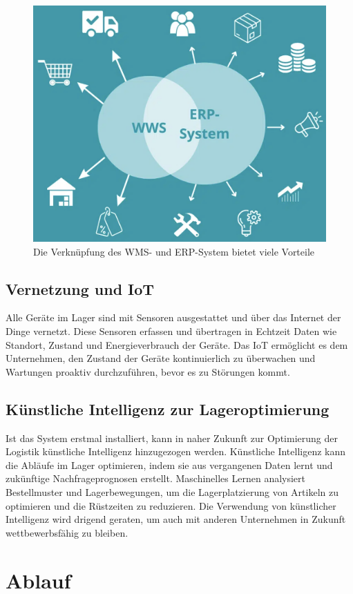 \begin{figure}[H]
	\centering
	\includegraphics[width=0.8\linewidth]{images/ERP}
	\caption{Die Verknüpfung des WMS- und ERP-System bietet viele Vorteile}
	\label{fig:92105db8-75fe-4262-9bd0-b83cf46d7e20}
\end{figure}

\subsection{Vernetzung und IoT}
 Alle Geräte im Lager sind mit Sensoren ausgestattet und über das Internet der Dinge vernetzt. Diese Sensoren erfassen und übertragen in Echtzeit Daten wie Standort, Zustand und Energieverbrauch der Geräte. Das IoT ermöglicht es dem Unternehmen, den Zustand der Geräte kontinuierlich zu überwachen und Wartungen proaktiv durchzuführen, bevor es zu Störungen kommt.

\subsection{Künstliche Intelligenz zur Lageroptimierung}
Ist das System erstmal installiert, kann in naher Zukunft zur Optimierung der Logistik künstliche Intelligenz hinzugezogen werden. Künstliche Intelligenz kann die Abläufe im Lager optimieren, indem sie aus vergangenen Daten lernt und zukünftige Nachfrageprognosen erstellt. Maschinelles Lernen analysiert Bestellmuster und Lagerbewegungen, um die Lagerplatzierung von Artikeln zu optimieren und die Rüstzeiten zu reduzieren. Die Verwendung von künstlicher Intelligenz wird drigend geraten, um auch mit anderen Unternehmen in Zukunft wettbewerbsfähig zu bleiben.


\section{Ablauf}



